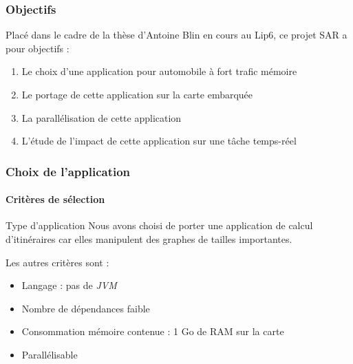 \begin{frame}
  \frametitle{Objectifs}
  Placé dans le cadre de la thèse d'Antoine Blin en cours au Lip6, ce projet SAR
  a pour objectifs :
  \vspace{1em}
  \begin{enumerate}
  \item Le choix d'une application pour automobile à fort trafic mémoire
    \vspace{1em}
  \item Le portage de cette application sur la carte embarquée
    \vspace{1em}
  \item La parallélisation de cette application
    \vspace{1em}
  \item L'étude de l'impact de cette application sur une tâche temps-réel
  \end{enumerate}
\end{frame}

\begin{frame}
  \frametitle{Choix de l'application}
  \framesubtitle{Critères de sélection}
  \begin{block}{Type d'application}
    Nous avons choisi de porter une application de calcul d'itinéraires car elles
    manipulent des graphes de tailles importantes.
  \end{block}
  Les autres critères sont :
  \begin{itemize}
  \item Langage : pas de \textit{JVM}
    \vspace{1em}
  \item Nombre de dépendances faible
    \vspace{1em}
  \item Consommation mémoire contenue : 1 Go de RAM sur la carte
    \vspace{1em}
  \item Parallélisable
  \end{itemize}
\end{frame}

